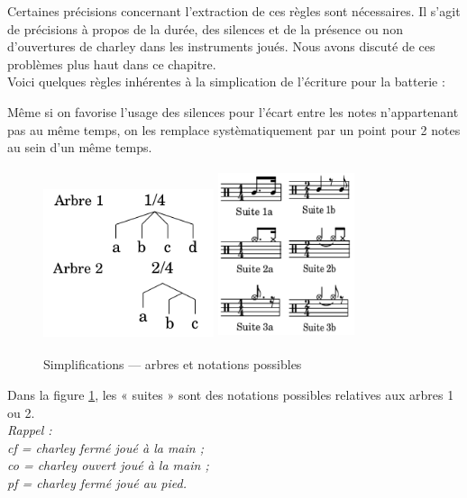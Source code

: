 Certaines précisions concernant l’extraction de ces règles sont nécessaires. 
Il s’agit de précisions à propos de la durée, des silences et de la présence ou
non d’ouvertures de charley dans les instruments joués. 
Nous avons discuté de ces problèmes plus haut dans ce chapitre.\\

Voici quelques règles inhérentes à la simplication de l’écriture pour la
batterie :

Même si on favorise l’usage des silences pour l’écart entre les notes
n’appartenant pas au même temps, on les remplace systèmatiquement par un point
pour 2 notes au sein d’un même temps.

\begin{figure}[h]
	\centering
	\includegraphics[height=45mm, width=50mm]{
    z_images/3_methodes/2_systemes/simplification_0.png}
	\includegraphics[height=50mm, width=40mm]{
    z_images/3_methodes/2_systemes/simplification_2.png}
	\caption{Simplifications — arbres et notations possibles}
	\label{simpl}
\end{figure}

Dans la figure \ref{simpl}, les « suites » sont des notations possibles
relatives aux arbres 1 ou 2.\\

\textit{Rappel :\\cf = charley fermé joué à la main ;\\co = charley ouvert joué
à la main ;\\ pf = charley fermé joué au pied.}\newpage

